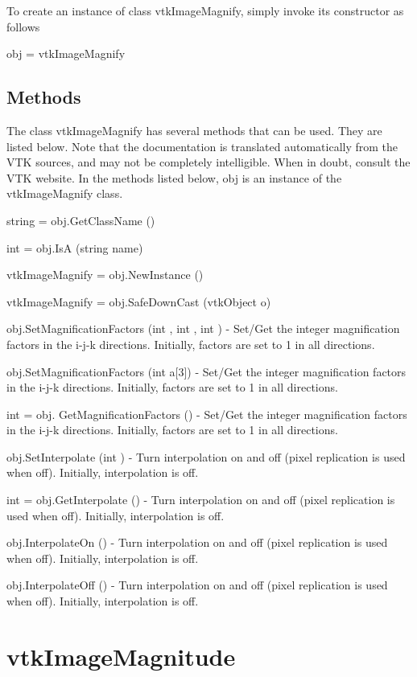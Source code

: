 To create an instance of class vtk\-Image\-Magnify, simply invoke its constructor as follows \begin{DoxyVerb}  obj = vtkImageMagnify
\end{DoxyVerb}
 \hypertarget{vtkwidgets_vtkxyplotwidget_Methods}{}\subsection{Methods}\label{vtkwidgets_vtkxyplotwidget_Methods}
The class vtk\-Image\-Magnify has several methods that can be used. They are listed below. Note that the documentation is translated automatically from the V\-T\-K sources, and may not be completely intelligible. When in doubt, consult the V\-T\-K website. In the methods listed below, {\ttfamily obj} is an instance of the vtk\-Image\-Magnify class. 
\begin{DoxyItemize}
\item {\ttfamily string = obj.\-Get\-Class\-Name ()}  
\item {\ttfamily int = obj.\-Is\-A (string name)}  
\item {\ttfamily vtk\-Image\-Magnify = obj.\-New\-Instance ()}  
\item {\ttfamily vtk\-Image\-Magnify = obj.\-Safe\-Down\-Cast (vtk\-Object o)}  
\item {\ttfamily obj.\-Set\-Magnification\-Factors (int , int , int )} -\/ Set/\-Get the integer magnification factors in the i-\/j-\/k directions. Initially, factors are set to 1 in all directions.  
\item {\ttfamily obj.\-Set\-Magnification\-Factors (int a\mbox{[}3\mbox{]})} -\/ Set/\-Get the integer magnification factors in the i-\/j-\/k directions. Initially, factors are set to 1 in all directions.  
\item {\ttfamily int = obj. Get\-Magnification\-Factors ()} -\/ Set/\-Get the integer magnification factors in the i-\/j-\/k directions. Initially, factors are set to 1 in all directions.  
\item {\ttfamily obj.\-Set\-Interpolate (int )} -\/ Turn interpolation on and off (pixel replication is used when off). Initially, interpolation is off.  
\item {\ttfamily int = obj.\-Get\-Interpolate ()} -\/ Turn interpolation on and off (pixel replication is used when off). Initially, interpolation is off.  
\item {\ttfamily obj.\-Interpolate\-On ()} -\/ Turn interpolation on and off (pixel replication is used when off). Initially, interpolation is off.  
\item {\ttfamily obj.\-Interpolate\-Off ()} -\/ Turn interpolation on and off (pixel replication is used when off). Initially, interpolation is off.  
\end{DoxyItemize}\hypertarget{vtkimaging_vtkimagemagnitude}{}\section{vtk\-Image\-Magnitude}\label{vtkimaging_vtkimagemagnitude}
